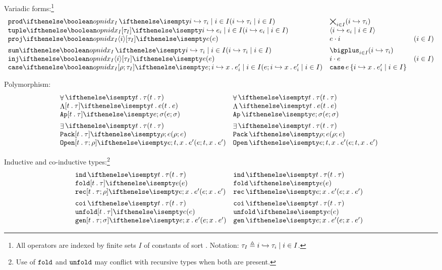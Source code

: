 \documentclass[11pt,twoside]{article}
\begin{document}
Variadic forms:\footnote{All operators are indexed by finite sets $I$ of constants of sort .  Notation: $\tau_I\eqdef \finmap{I}{i}{\tau}$.}
\begin{displaymath}
  \begin{array}{l@{\quad}l@{\quad}l}
    \vprodty<I><i>{\tau} & \vprodty*{\tau} \\
    \vtupleex<I>[\tau]{e} & \vtupleex*<I>{e} \\
    \vprojex<I><i>[\tau]{e} & \vprojex*<i>{e} & (i\in I) \\[1ex]

    \vsumty<I><i>{\tau}  & \vsumty*<I><i>{\tau} \\
    \vinjex<I><i>[\tau]{e} & \vinjex*<I><i>{e} & (i\in I) \\
    \vcaseex<I>[\rho][\tau]{e}{x}{e'}  & \vcaseex*<I>{e}{x}{e'} 
  \end{array}
\end{displaymath}

Polymorphism:
\begin{displaymath}
  \begin{array}{l@{\quad}l@{\quad}l}
    \Allty{t}{\tau} & \Allty*{t}{\tau} \\
    \Lamex{t}[\tau]{e} & \Lamex*{t}{e} \\
    \Appex[t][\tau]{e}{\sigma} & \Appex*{e}{\sigma}\\[1ex]
    \Somety{t}{\tau}  & \Somety*{t}{\tau} \\
    \Packex[t][\tau]{\rho}{e} & \Packex*{\rho}{e} \\
    \Openex[t][\tau]{e}[\rho]{x}{e'} & \Openex*[t][\tau]{e}[\rho]{x}{e'}
  \end{array}
\end{displaymath}

Inductive and co-inductive types:\footnote{Use of $\Opn{fold}$ and $\Opn{unfold}$ may conflict with recursive types when both are present.}
\begin{displaymath}
  \begin{array}{l@{\quad}l@{\quad}l}
    \indty{t}{\tau} & \indty*{t}{\tau} \\
    \foldex[t][\tau]{e} & \foldex*{e} \\
    \recex[t][\tau][\rho]{e}{x}{e'} & \recex*{e}{x}{e'} \\[1ex]
    \coity{t}{\tau} & \coity*{t}{\tau} \\
    \unfoldex[t][\tau]{e} & \unfoldex*{e} \\
    \genex[t][\tau][\sigma]{e}{x}{e'} & \genex*{e}{x}{e'}
  \end{array}
\end{displaymath}
\end{document}
